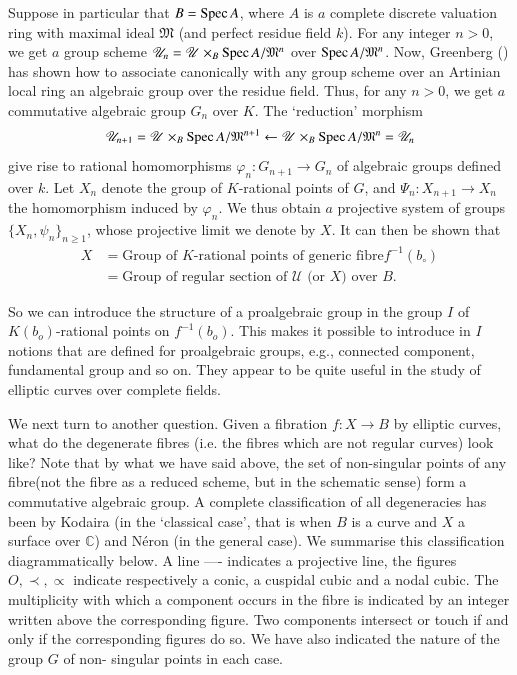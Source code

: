 Suppose in particular that $B = \operatorname{Spec} A$, where $A$ is $a$ complete
discrete valuation ring with maximal ideal $\mathfrak{M}$ (and
perfect\pageoriginale 
residue field $k$). For any integer $n> 0$, we get $a$ group scheme
$\mathscr{U}_n = \mathscr{U} \times_B \operatorname{Spec} A/\mathfrak{M}^n$ over
$\operatorname{Spec} A/\mathfrak{M}^n$. Now, Greenberg (\cite{key16}) has shown how to
associate canonically with any group  scheme over an Artinian local
ring an algebraic group  over the residue field. Thus, for any $n>0$,
we get $a$ commutative algebraic group $G_n$ over $K$. The `reduction'
morphism  
$$
\mathscr{U} _{n+1}= \mathscr{U} \times_B \operatorname{Spec} A/\mathfrak{M}^{n+1}
 \leftarrow \mathscr{U} \times_B \operatorname{Spec} A/\mathfrak{M}^n =
 \mathscr{U}_n 
$$ 
give  rise to rational homomorphisms $\varphi_n :
G_{n+1} \rightarrow G_n$ of algebraic groups defined over $k$. Let
$X_n$ denote the group  of $K$-rational points of $G$, and $ \Psi_n :
X_{n+1} \rightarrow X_n$  the homomorphism induced by $\varphi_n$. We
thus obtain $a$ projective system of groups $ \{ X_n , \psi _n\}
_{n\ge 1}$, whose projective limit we denote by $X$. It can then be
shown that 			 
\begin{align*}
  X &= \text{Group of $K$-rational points of generic fibre} f^{-1}(b_\circ)\\
  &= \text{Group of regular section of } \mathscr{U}  \text{ (or $X$)
    over $B$}. 
\end{align*}

So we can introduce the structure of a proalgebraic group in the group
$I$ of $K(b_o)$-rational points on $ f^{-1}(b_o)$. This makes it
possible to introduce in $I$ notions that are defined for proalgebraic
groups, e.g., connected component, fundamental group and so on. They
appear to be quite  useful in the study of elliptic curves over
complete fields. 

We next turn to another question. Given a fibration  $f:X \rightarrow
B$ by elliptic curves, what do the degenerate fibres (i.e. the fibres
which are not regular curves) look like? Note that by what we have
said above, the set of non-singular points of   any
fibre\pageoriginale (not the 
fibre as a reduced scheme,  but in the schematic sense) form a
commutative algebraic group. A complete classification of all
degeneracies has been by Kodaira (in  the `classical case', that is
when $B$ is a curve and $X$ a surface over $\mathbb{C}$) and N\'eron
(in the general case).  We
summarise this classification diagrammatically below. A line  ----
indicates a projective line, the figures $O, \prec, \propto $
indicate respectively a conic, a cuspidal cubic and  a nodal
cubic. The multiplicity with which a component occurs in the fibre is
indicated by an integer written above the corresponding  figure. Two
components intersect or touch if and only if the corresponding figures
do so. We have also indicated the nature of the group $G$ of non-
singular points in each case. 

